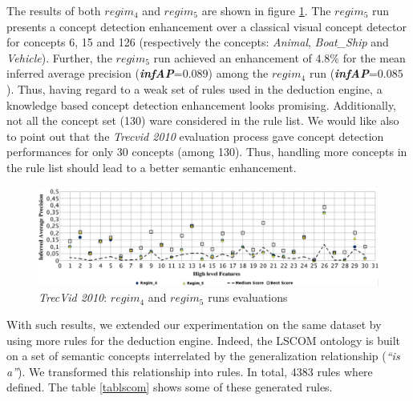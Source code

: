 		The results of both $regim_{4}$ and $regim_{5}$ are shown in figure \ref{res1tervcid2010}.
		The $regim_{5}$ run presents a concept detection enhancement over a classical visual concept 
		detector for concepts 6,  15 and 126 (respectively the concepts: \textit{Animal}, \textit{Boat\_Ship} and  
		\textit{Vehicle}). Further, the \textit{$regim_{5}$} run achieved an enhancement of $4.8\%$ for the mean inferred average
		precision (\textit{\textbf{infAP}}=$0.089$) among the \textit{$regim_{4}$} run (\textit{\textbf{infAP}}=$0.085$).
		Thus, having regard to a weak set of rules used in the deduction engine, 
		a knowledge based concept detection enhancement looks promising. Additionally, not all the concept set (130) 
		ware considered in the rule list. 
		We would like also to point out that the \textit{Trecvid 2010} evaluation process
		gave concept detection performances for only 30 concepts (among 130). 
		Thus, handling more concepts in the rule list should lead to a better semantic enhancement.

		\begin{figure}[ht!]	
			\centering
			\includegraphics[width=1\textwidth]{graphics/trecvid3}
			\caption{\textit{TrecVid 2010}: $regim_{4}$ and $regim_{5}$ runs evaluations}
			\label{res1tervcid2010}
		\end{figure}

		With such results, we extended our experimentation on the same dataset by using more rules 
		for the deduction engine. Indeed, the LSCOM ontology is built on a set of semantic concepts
		interrelated by the generalization relationship (\textit{``is a''}). We transformed this 
		relationship into rules. In total, 4383 rules where defined. The table \ref{tablscom} 
		shows some of these generated rules.

